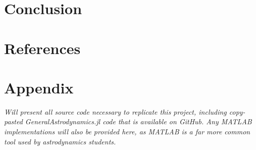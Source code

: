 \documentclass[conf]{new-aiaa}
\renewcommand\refname{}
\begin{document}
\begin{multicols}{2}
\section{Conclusion}

\section{References}
\nocite{*}
\renewcommand\refname{\vskip -0.9cm}


\section{Appendix}
\textit{
    Will present all source code necessary to replicate 
    this project, including copy-pasted GeneralAstrodynamics.jl
    code that is available on GitHub. Any MATLAB implementations 
    will also be provided here, as MATLAB is a far more common 
    tool used by astrodynamics students. 
}

\end{multicols}
\end{document}
